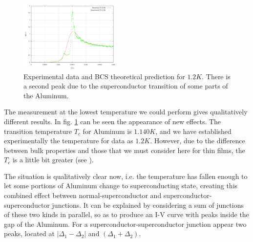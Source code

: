 \begin{figure}[h!]
\centering
\includegraphics[width=0.45\textwidth]{gv_theo_exp_10}
\caption{\small Experimental data and BCS theoretical prediction for $1.2 K$. There is a second peak due to the superconductor transition of some parts of the Aluminum.
\label{gv_theo_exp_10}}
\end{figure}

The measurement at the lowest temperature we could perform gives qualitatively different results. In fig. \ref{gv_theo_exp_10} can be seen the appearance of new effects. The transition temperature $T_c$ for Aluminum is $1.140 K$, and we have established experimentally the temperature for data as $1.2 K$. However, due to the difference between bulk properties and those that we must consider here for thin films, the $T_c$ is a little bit greater (see \cite{films}).

The situation is qualitatively clear now, i.e. the temperature has fallen enough to let some portions of Aluminum change to superconducting state, creating this combined effect between normal-superconductor and superconductor-superconductor junctions. It can be explained by considering a sum of junctions of these two kinds in parallel, so as to produce an I-V curve with peaks inside the gap of the Aluminum. For a superconductor-superconductor junction appear two peaks, located at $| \Delta_1-\Delta_2|$ and $(\Delta_1+\Delta_2)$.

